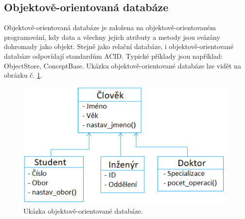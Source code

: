 \subsection{Objektově-orientovaná databáze}
Objektově-orientovaná databáze je založena na objektově-orientovaném programování, kdy data a všechny jejich atributy a metody jsou svázány dohromady jako objekt. Stejně jako relační databáze, i objektově-orientované databáze odpovídají standardům \gls{ACID}. Typické příklady jsou například: ObjectStore, ConceptBase. Ukázku objektově-orientované databáze lze vidět na obrázku č. \ref{fig:db_img_oo}.
	\begin{figure}[H]
	\centering
	\includegraphics[width=11cm]{img/databaze/oo_db}
	\caption{Ukázka objektově-orientované databáze.}
	\label{fig:db_img_oo}
	\end{figure}
